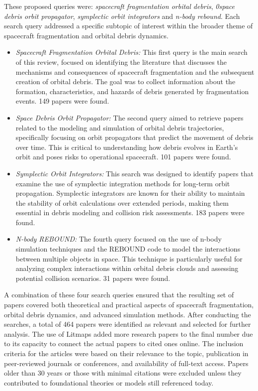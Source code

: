 \documentclass[journal ]{new-aiaa}
\begin{document}
These proposed queries were: \textit{spacecraft fragmentation orbital debris}, \textit{0space debris orbit propagator}, \textit{symplectic orbit integrators} and \textit{n-body rebound}. Each search query addressed a specific subtopic of interest within the broader theme of spacecraft fragmentation and orbital debris dynamics.

\begin{itemize}
    \item \textit{Spacecraft Fragmentation Orbital Debris:} This first query is the main search of this review, focused on identifying the literature that discusses the mechanisms and consequences of spacecraft fragmentation and the subsequent creation of orbital debris. The goal was to collect information about the formation, characteristics, and hazards of debris generated by fragmentation events. 149 papers were found.
    \item \textit{Space Debris Orbit Propagator:} The second query aimed to retrieve papers related to the modeling and simulation of orbital debris trajectories, specifically focusing on orbit propagators that predict the movement of debris over time. This is critical to understanding how debris evolves in Earth’s orbit and poses risks to operational spacecraft. 101 papers were found.
    \item \textit{Symplectic Orbit Integrators:} This search was designed to identify papers that examine the use of symplectic integration methods for long-term orbit propagation. Symplectic integrators are known for their ability to maintain the stability of orbit calculations over extended periods, making them essential in debris modeling and collision risk assessments. 183 papers were found.
    \item \textit{N-body REBOUND:} The fourth query focused on the use of n-body simulation techniques and the REBOUND code to model the interactions between multiple objects in space. This technique is particularly useful for analyzing complex interactions within orbital debris clouds and assessing potential collision scenarios. 31 papers were found.
\end{itemize}

A combination of these four search queries ensured that the resulting set of papers covered both theoretical and practical aspects of spacecraft fragmentation, orbital debris dynamics, and advanced simulation methods. After conducting the searches, a total of 464 papers were identified as relevant and selected for further analysis. The use of Litmaps added more research papers to the final number due to its capacity to connect the actual papers to cited ones online. The inclusion criteria for the articles were based on their relevance to the topic, publication in peer-reviewed journals or conferences, and availability of full-text access. Papers older than 30 years or those with minimal citations were excluded unless they contributed to foundational theories or models still referenced today.
\end{document}
